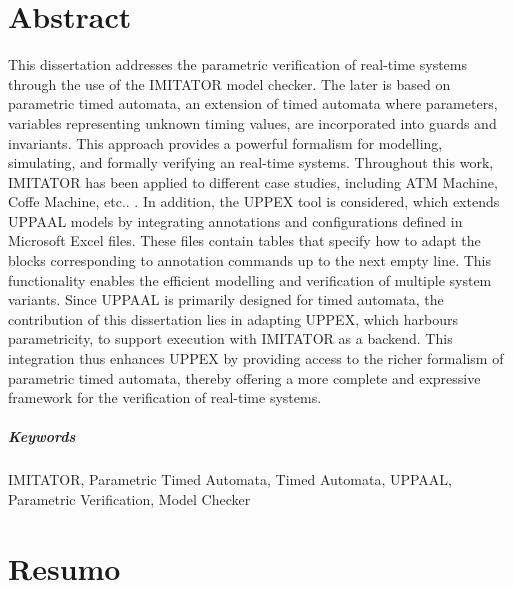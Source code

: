 \chapter*{Abstract}

This dissertation addresses the parametric verification of real-time systems through the use of the IMITATOR model checker. The later is based on parametric timed automata, an extension of timed automata where parameters, variables representing unknown timing values, are incorporated into guards and invariants. This approach provides a powerful formalism for modelling, simulating, and formally verifying an real-time systems. Throughout this work, IMITATOR has been applied to different case studies, including ATM Machine, Coffe Machine, etc.. . In addition, the UPPEX tool is considered, which extends UPPAAL models by integrating annotations and configurations defined in Microsoft Excel files. These files contain tables that specify how to adapt the blocks corresponding to annotation commands up to the next empty line. This functionality enables the efficient modelling and verification of multiple system variants. Since UPPAAL is primarily designed for timed automata, the contribution of this dissertation lies in adapting UPPEX, which harbours parametricity, to support execution with IMITATOR as a backend. This integration thus enhances UPPEX by providing access to the richer formalism of parametric timed automata, thereby offering a more complete and expressive framework for the verification of real-time systems.
\paragraph{Keywords} IMITATOR, Parametric Timed Automata, Timed Automata, UPPAAL, Parametric Verification, Model Checker 

\cleardoublepage

\chapter*{Resumo}

